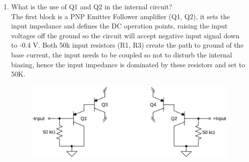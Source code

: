 \documentclass[journal,12pt,twocolumn]{IEEEtran}
\renewcommand\thesection{\arabic{section}}
\begin{document}
\begin{enumerate}[label=\thesection.\arabic*,ref=\thesection.\theenumi]
\item What is the use of Q1 and Q2 in the internal circuit?\\
\solution
The first block is a PNP Emitter Follower amplifier (Q1, Q2), it sets the input impedance and defines the DC operation points, raising the input voltages off the ground so the circuit will accept negative input signal down to -0.4 V. Both 50k input resistors (R1, R3) create the path to ground of the base current, the input needs to be coupled so not to disturb the internal biasing, hence the input impedance is dominated by these resistors and set to 50K.
\begin{figure}[!ht]
\centering
\includegraphics[width=\columnwidth]{./figs/lm3861.eps}
\caption{}
\label{fig:1}
\end{figure}
\end{enumerate}
\end{document}
